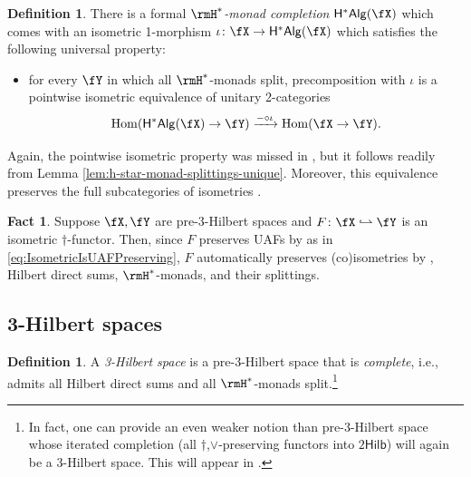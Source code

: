 \documentclass[12pt, reqno]{amsart}
\DeclareMathOperator{\Hom}{Hom}
\newcommand{\isometry}{\mathrel{\,\joinrel\lhook\joinrel\rightharpoonup}}
\newcommand{\Hilb}{\mathsf{Hilb}}
\newcommand{\HstarAlg}{\mathsf{H^*Alg}}
\theoremstyle{plain}
\theoremstyle{definition}
\newtheorem{defn}[thm]{Definition}
\newtheorem{fact}[thm]{Fact}
\begin{document}
\begin{defn} 
There is a formal \emph{$\rmH^*$-monad completion} 
$\HstarAlg(\fX)$
which comes with an isometric 1-morphism $\iota\colon \fX\to \HstarAlg(\fX)$ 
which 
satisfies the following universal property: \begin{itemize} 
\item for every $\fY$ in which all $\rmH^*$-monads split, precomposition with $\iota$ is a
pointwise isometric equivalence of unitary 2-categories
$$
\Hom( \HstarAlg(\fX)\to \fY)
\xrightarrow{-\circ \iota}
\Hom(\fX\to \fY).
$$
\end{itemize}
Again, the pointwise isometric property was missed in \cite[Prop.~4.43]{MR5078555}, but it follows readily from Lemma \ref{lem:h-star-monad-splittings-unique}.
Moreover, this equivalence preserves the full subcategories of isometries \cite[Prop.~4.43]{MR5078555}.
\end{defn} 

\begin{fact}
\label{fact:IsometricPreservesStuff}
Suppose $\fX,\fY$ are pre-3-Hilbert spaces and $F\colon \fX\isometry \fY$ is an isometric $\dag$-functor. 
Then, since $F$ preserves UAFs by \cite[Prop.~4.9]{MR5078555} as in \eqref{eq:IsometricIsUAFPreserving},
$F$ automatically preserves (co)isometries by \cite[Lem.~4.23]{MR5078555}, Hilbert direct sums, $\rmH^*$-monads, and their splittings.
\end{fact}


\subsection{3-Hilbert spaces}

\begin{defn}
A \emph{3-Hilbert space} is a pre-3-Hilbert space that is \emph{complete}, i.e., admits all Hilbert direct sums and all $\rmH^*$-monads split.\footnote{In fact, one can provide an even weaker notion than pre-3-Hilbert space whose iterated completion (all $\dag$,$\vee$-preserving functors into $2\Hilb$) will again be a 3-Hilbert space.
This will appear in \cite{UnitaryDiskLike}.
}
\end{defn}
\end{document}
